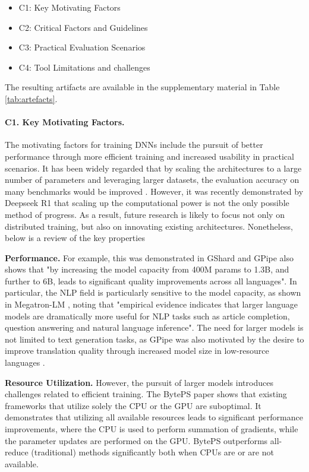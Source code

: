 \begin{itemize}
	\item C1: Key Motivating Factors
	\item C2: Critical Factors and Guidelines
	\item C3: Practical Evaluation Scenarios
	\item C4: Tool Limitations and challenges
\end{itemize}

The resulting artifacts are available in the supplementary material in Table \ref{tab:artefacts}.

\paragraph{C1. Key Motivating Factors.}
The motivating factors for training DNNs include the pursuit of better performance through more
efficient training and increased usability in practical scenarios. It has been widely regarded that
by scaling the architectures to a large number of parameters and leveraging larger datasets, the
evaluation accuracy on many benchmarks would be improved \cite{hestness_deep_2017}. However, it was
recently demonstrated by Deepseek R1
\cite{deepseekai2025deepseekr1incentivizingreasoningcapability} that scaling up the computational
power is not the only possible method of progress. As a result, future research is likely to focus
not only on distributed training, but also on innovating existing architectures. Nonetheless, below
is a review of the key properties

\textbf{Performance.}
For example, this was demonstrated in GShard \cite{kaplan_scaling_2020} and GPipe
\cite{huang_gpipe_2019} also shows that "by increasing the model capacity from 400M params to 1.3B,
and further to 6B, leads to significant quality improvements across all languages". In particular,
the NLP field is particularly sensitive to the model capacity, as shown in Megatron-LM
\cite{shoeybi_megatron-lm_2020}, noting that "empirical evidence indicates that larger language
models are dramatically more useful for NLP tasks such as article completion, question answering
and natural language inference". The need for larger models is not limited to text generation
tasks, as GPipe was also motivated by the desire to improve translation quality through increased
model size in low-resource languages \cite{huang_gpipe_2019}.

\textbf{Resource Utilization.}
However, the pursuit of larger models introduces challenges related to efficient training. The
BytePS paper \cite{jiang_unified_nodate} shows that existing frameworks that utilize solely the
CPU or the GPU are suboptimal. It demonstrates that utilizing all available resources leads to
significant performance improvements, where the CPU is used to perform summation of gradients,
while the parameter updates are performed on the GPU. BytePS outperforms all-reduce (traditional)
methods significantly both when CPUs are or are not available.

